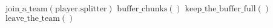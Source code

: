 \documentclass{article}
\begin{document}
\pagestyle{empty}

\newcommand{\send}{\Rightarrow}
\newcommand{\sendto}{\rightarrow}
\algrenewcommand{}
\algrenewcommand\textproc{\textrm}

\begin{algorithmic}

  \State $\mathrm{join\_a\_team(player.splitter)}$
  \State $\mathrm{buffer\_chunks}()$
  \State $\mathrm{keep\_the\_buffer\_full}()$
  \EndWhile
  \State $\mathrm{leave\_the\_team}()$
  \EndProcedure
    
\end{algorithmic}
\end{document}
